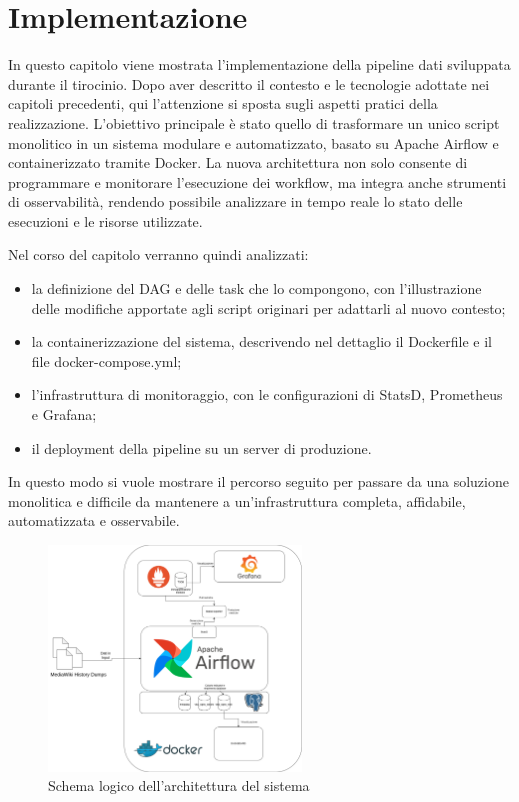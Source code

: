 \chapter{Implementazione}
\label{cha:implementazione}

In questo capitolo viene mostrata l'implementazione della pipeline dati sviluppata durante
il tirocinio. Dopo aver descritto il contesto e le tecnologie adottate nei capitoli precedenti, qui l’attenzione si sposta sugli aspetti pratici della realizzazione.
L’obiettivo principale è stato quello di trasformare un unico script monolitico in un sistema modulare e automatizzato, basato su Apache Airflow e containerizzato tramite Docker. La nuova architettura non solo consente di programmare e monitorare l’esecuzione dei workflow, ma integra anche strumenti di osservabilità, rendendo possibile analizzare in tempo reale lo stato delle esecuzioni e le risorse utilizzate.

Nel corso del capitolo verranno quindi analizzati:


\begin{itemize}
    \item la definizione del DAG e delle task che lo compongono, con l’illustrazione delle modifiche apportate agli script originari per adattarli al nuovo contesto;
    \item la containerizzazione del sistema, descrivendo nel dettaglio il Dockerfile e il file docker-compose.yml;
    \item l’infrastruttura di monitoraggio, con le configurazioni di StatsD, Prometheus e Grafana;
    \item il deployment della pipeline su un server di produzione.
\end{itemize}

In questo modo si vuole mostrare il percorso seguito per passare da una soluzione monolitica e difficile da mantenere a un’infrastruttura completa, affidabile, automatizzata e osservabile.

\begin{figure}[ht]
    \centering
    \includegraphics[width=0.6\textwidth]{img/vital-signs-pipeline.drawio.png}
    \caption{Schema logico dell'architettura del sistema}
    \label{fig:architettura_sistema}
\end{figure}

